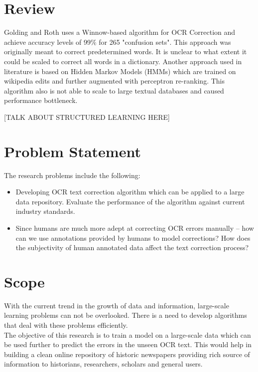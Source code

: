 \documentclass{article}
\begin{document}
\section{Review} 

Golding and Roth \cite{winnow} uses a Winnow-based algorithm for OCR Correction and achieve accuracy levels of 99\% for 265 "confusion sets". This approach was originally meant to correct predetermined words. It is unclear to what extent it could be scaled to correct all words in a dictionary. 
Another approach used in literature \cite{wikiedits} is based on Hidden Markov Models (HMMs) which are trained on wikipedia edits and further augmented with perceptron re-ranking. This algorithm also is not able to scale to large textual databases and caused performance bottleneck.

[TALK ABOUT STRUCTURED LEARNING HERE]
\section{Problem Statement}
The research problems include the following:
\begin{itemize}
\item Developing OCR text correction algorithm which can be applied to a large data repository. Evaluate the performance of the algorithm against current industry standards.
\item Since humans are much more adept at correcting OCR errors manually -- how can we use annotations provided by humans to model corrections? How does the subjectivity of human annotated data affect the text correction process?
\end{itemize} 

 
\section{Scope}
With the current trend in the growth of data and information, large-scale learning problems can not be overlooked. There is a need to develop algorithms that deal with these problems efficiently.\\
The objective of this research is to train a model on a large-scale data which can be used further to predict the errors in the unseen OCR text.
This would help in building a clean online repository of historic newspapers providing rich source of information to historians, researchers, scholars and general users.

\nocite{winnow,wikiedits,carlson1999snow,menon2009large,book,Joachims:1999:MLS:299094.299104,ibm}


\end{document}
